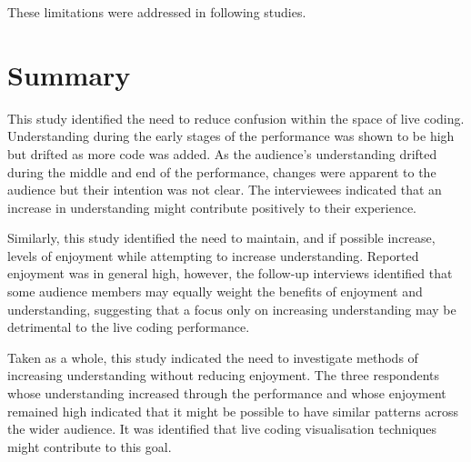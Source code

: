 These limitations were addressed in following studies.

\section{Summary}

This study identified the need to reduce confusion within the space of live coding. Understanding during the early stages of the performance was shown to be high but drifted as more code was added. As the audience's understanding drifted during the middle and end of the performance, changes were apparent to the audience but their intention was not clear. The interviewees indicated that an increase in understanding might contribute positively to their experience.

Similarly, this study identified the need to maintain, and if possible increase, levels of enjoyment while attempting to increase understanding. Reported enjoyment was in general high, however, the follow-up interviews identified that some audience members may equally weight the benefits of enjoyment and understanding, suggesting that a focus only on increasing understanding may be detrimental to the live coding performance.

Taken as a whole, this study indicated the need to investigate methods of increasing understanding without reducing enjoyment. The three respondents whose understanding increased through the performance and whose enjoyment remained high indicated that it might be possible to have similar patterns across the wider audience. It was identified that live coding visualisation techniques might contribute to this goal.


